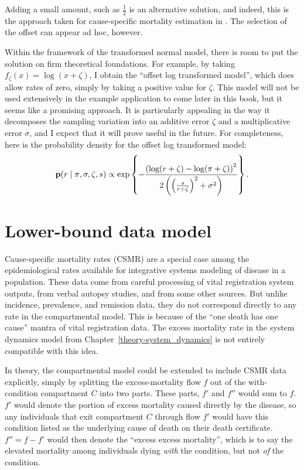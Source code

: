 Adding a small amount, such as $\frac{1}{2}$ is an alternative solution, and
indeed, this is the approach taken for cause-specific mortality
estimation in \cite{Girotsis King-Demographic Forecasting}.  The
selection of the offset can appear ad hoc, however.

Within the framework of the transformed normal model, there is room to
put the solution on firm theoretical foundations.  For example, by
taking $f_\zeta(x) = \log(x + \zeta)$, I obtain the ``offset log
transformed model'', which does allow rates of zero, simply by taking
a positive value for $\zeta$.  This model will not be used extensively
in the example application to come later in this book, but it seems
like a promising approach.  It is particularly appealing in the way it
decomposes the sampling variation into an additive error $\zeta$ and a
multiplicative error $\sigma$, and I expect that it will prove useful
in the future.  For completeness, here is the probability density for
the offset log transformed model:
\[
\mathbf{p}(r\;|\; \pi, \sigma,\zeta, s)
\propto \exp\left\{
-\frac{\left(\log(r+\zeta)-\log(\pi+\zeta)\right)^2}
      {2\left(\left(\frac{s}{r+\zeta}\right)^2+\sigma^2\right)}
\right\}.
\]

\section{Lower-bound data model}
Cause-specific mortality rates (CSMR) are a special case among the
epidemiological rates available for integrative systems modeling of
disease in a population.  These data come from careful processing of
vital registration system outputs, from verbal autopsy studies, and
from some other sources. But unlike incidence, prevalence, and
remission data, they do not correspond directly to any rate in the
compartmental model.  This is because of the ``one death has one
cause'' mantra of vital registration data.  The excess mortality rate
in the system dynamics model from Chapter~\ref{theory-system_dynamics}
is not entirely compatible with this idea.

In theory, the compartmental model could be extended to include CSMR
data explicitly, simply by splitting the excess-mortality flow $f$ out
of the with-condition compartment $C$ into two parts.  These parts,
$f'$ and $f''$ would sum to $f$. $f'$ would denote the portion of
excess mortality caused directly by the disease, so any individuals
that exit compartment $C$ through flow $f'$ would have this condition
listed as the underlying cause of death on their death certificate.
$f'' = f - f'$ would then denote the ``excess excess mortality'',
which is to say the elevated mortality among individuals dying
\emph{with} the condition, but not \emph{of} the condition.

